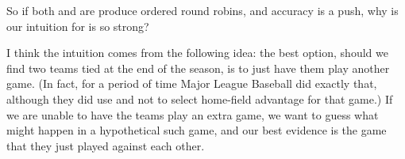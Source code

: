 {    So if both  and  are produce ordered round robins, and accuracy is a push, why is our intuition for  is so strong?

    I think the intuition comes from the following idea: the best option, should we find two teams tied at the end of the season, is to just have them play another game. (In fact, for a period of time Major League Baseball did exactly that, although they did use  and not  to select home-field advantage for that game.) If we are unable to have the teams play an extra game, we want to guess what might happen in a hypothetical such game, and our best evidence is the game that they just played against each other.
}